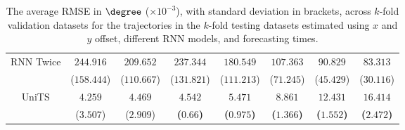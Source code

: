 \begin{table}[!ht]
{\begin{tabular}{|c|c|c|c|c|c|c|c|}
			\multirow{2}{*}{RNN Twice} & $244.916$ & $209.652$ & $237.344$ & $180.549$ & $107.363$ & $90.829$ & $83.313$ \\
			 & ($158.444$) & ($110.667$) & ($131.821$) & ($111.213$) & ($71.245$) & ($45.429$) & ($30.116$) \\ \hline
			\multirow{2}{*}{UniTS} & $4.259$ & $4.469$ & $\mathbf{4.542}$ & $\mathbf{5.471}$ & $\mathbf{8.861}$ & $\mathbf{12.431}$ & $\mathbf{16.414}$ \\
			 & ($3.507$) & ($2.909$) & \textbf{(}$\mathbf{0.66}$\textbf{)} & \textbf{(}$\mathbf{0.975}$\textbf{)} & \textbf{(}$\mathbf{1.366}$\textbf{)} & \textbf{(}$\mathbf{1.552}$\textbf{)} & \textbf{(}$\mathbf{2.472}$\textbf{)} \\ \hline
		\end{tabular}
	}
	\caption{The average RMSE in $\degree$ ($\times 10^{-3}$), with standard deviation in brackets, across $k$-fold validation datasets for the trajectories in the $k$-fold testing datasets estimated using $x$ and $y$ offset, different RNN models, and forecasting times.}
	\label{tab:all_no_abs_RMSE}
\end{table}

